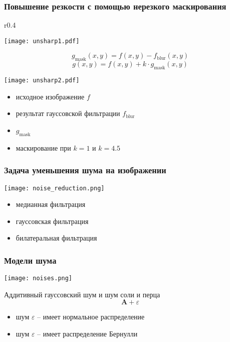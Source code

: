 \documentclass[
    12pt, 
    usepdftitle=false,
    aspectratio=1610
]{beamer}
\begin{document}
\begin{frame}
    \frametitle{Повышение резкости с помощью нерезкого маскирования}
    \begin{wrapfigure}{r}{0.4\textwidth}
        \begin{center}
            \texttt{[image: unsharp1.pdf]}
        \end{center}
    \end{wrapfigure}
    $$
        g_{\mbox{mask}}(x,y)=f(x,y)-f_{\mbox{blur}}(x,y)
    $$
    $$
        g(x, y) = f(x,y)+k\cdot g_{\mbox{mask}}(x,y)
    $$
    \begin{center}
        \texttt{[image: unsharp2.pdf]}
    \end{center}
    \begin{itemize}
        \item исходное изображение $f$
        \item результат гауссовской фильтрации $f_{\mbox{blur}}$
        \item $g_{\mbox{mask}}$
        \item маскирование при $k=1$ и $k=4.5$
    \end{itemize}
\end{frame}

\begin{frame}
\frametitle{Задача уменьшения шума на изображении}
\begin{center}
    \texttt{[image: noise\_reduction.png]}
\end{center}
\begin{itemize}
    \item медианная фильтрация
    \item гауссовская фильтрация
    \item билатеральная фильтрация
\end{itemize}
\end{frame}

\begin{frame}
\frametitle{Модели шума}
\begin{center}
    \texttt{[image: noises.png]}
\end{center}
Аддитивный гауссовский шум и шум соли и перца
$$
    \mathbf{A}+\varepsilon
$$
\begin{itemize}
    \item шум $\varepsilon$ -- имеет нормальное распределение
    \item шум $\varepsilon$ -- имеет распределение Бернулли
\end{itemize}
\end{frame}
\end{document}
